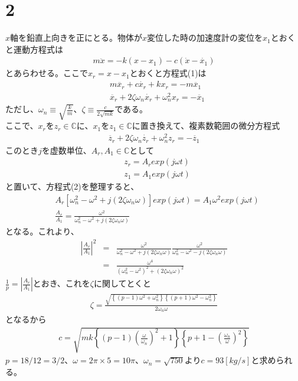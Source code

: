 \documentclass[pdflatex,ja=standard,fleqn]{bxjsarticle}
\begin{document}
\section*{2}
$x$軸を鉛直上向きを正にとる。物体が$x$変位した時の加速度計の変位を$x_{1}$とおくと運動方程式は
\begin{eqnarray}
    m\ddot{x}=-k(x-x_{1})-c(\dot{x}-\dot{x_{1}})
\end{eqnarray}
とあらわせる。ここで$x_{r}=x-x_{1}$とおくと方程式(1)は
\begin{align*}
    &m\ddot{x_{r}}+c\dot{x_{r}}+kx_{r}=-m\ddot{x_{1}}\\
    &\ddot{x_{r}}+2\zeta\omega_{n}\dot{x_{r}}+\omega_{n}^{2}x_{r}=-\ddot{x_{1}}
\end{align*}
ただし、$\omega_{n}\equiv\sqrt{\frac{k}{m}}$、$\zeta\equiv\frac{c}{2\sqrt{mk}}$である。\\
ここで、$x_{r}$を$z_{r}\in\mathbb{C}$に、$x_{1}$を$z_{1}\in\mathbb{C}$に置き換えて、複素数範囲の微分方程式
\begin{eqnarray}
    \ddot{z_{r}}+2\zeta\omega_{n}\dot{z_{r}}+\omega_{n}^{2}z_{r}=-\ddot{z_{1}}
\end{eqnarray}
このとき$j$を虚数単位、$A_{r},A_{1}\in\mathbb{C}$として
\begin{align*}
    &z_{r}=A_{r}exp(j\omega t)\\
    &z_{1}=A_{1}exp(j\omega t)
\end{align*}
と置いて、方程式(2)を整理すると、
\begin{align*}
    &A_{r}\left[\omega_{n}^{2}-\omega^{2}+j(2\zeta\omega_{n}\omega)\right]exp(j\omega t)=A_{1}\omega^{2}exp(j\omega t)\\
    &\frac{A_{r}}{A_{1}}=\frac{\omega^{2}}{\omega_{n}^{2}-\omega^{2}+j(2\zeta\omega_{n}\omega)}
\end{align*}
となる。これより、
\begin{eqnarray*}
    \left|\frac{A_{r}}{A_{1}}\right|^{2}&=&\frac{\omega^{2}}{\omega_{n}^{2}-\omega^{2}+j(2\zeta\omega_{n}\omega)}\frac{\omega^{2}}{\omega_{n}^{2}-\omega^{2}-j(2\zeta\omega_{n}\omega)}\\
    &=&\frac{\omega^{4}}{(\omega_{n}^{2}-\omega^{2})^{2}+(2\zeta\omega_{n}\omega)^{2}}
\end{eqnarray*}
$\frac{1}{p}=|\frac{A_{r}}{A_{1}}|$とおき、これを$\zeta$に関してとくと
\begin{eqnarray*}
    \zeta=\frac{\sqrt{\left\{(p-1)\omega^{2}+\omega_{n}^{2}\right\}\left\{(p+1)\omega^{2}-\omega_{n}^{2}\right\}}}{2\omega_{n}\omega}
\end{eqnarray*}
となるから
\begin{eqnarray*}
    c=\sqrt{mk\left\{\left(p-1\right)\left(\frac{\omega}{\omega_{n}}\right)^{2}+1\right\}\left\{p+1-\left(\frac{\omega_{n}}{\omega}\right)^{2}\right\}}
\end{eqnarray*}
$p=18/12=3/2$、$\omega=2\pi×5=10\pi$、$\omega_{n}=\sqrt{750}$より$c=93[kg/s]$と求められる。
\end{document}
